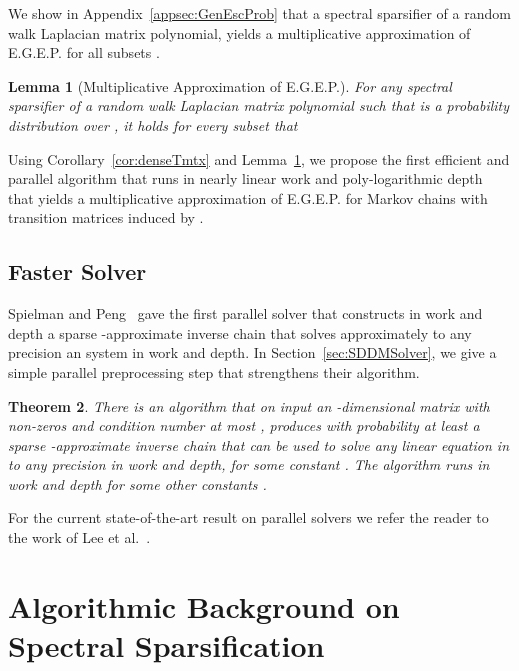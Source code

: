 \documentclass[11pt]{article}
\newtheorem{thm}{Theorem}  \newtheorem{fact}[thm]{Fact}
\newtheorem{lem}[thm]{Lemma}
\numberwithin{thm}{section}
\begin{document}
We show in Appendix~\ref{appsec:GenEscProb} that a spectral sparsifier of a random walk Laplacian matrix polynomial, yields a multiplicative approximation of E.G.E.P. for all subsets .

\begin{lem}[Multiplicative Approximation of E.G.E.P.]\label{lem_mulApproxEGEP}
For any spectral sparsifier  of a random walk Laplacian matrix polynomial such that  is a probability distribution over , it holds for every subset  that

\end{lem}

Using Corollary~\ref{cor:denseTmtx} and Lemma~\ref{lem_mulApproxEGEP}, we propose the first efficient and parallel algorithm that runs in nearly linear work and poly-logarithmic depth that yields a multiplicative approximation of E.G.E.P. for Markov chains with transition matrices induced by .



\subsection{Faster  Solver}\label{subsec:FSSMS}

Spielman and Peng~\cite{PS14} gave the first parallel  solver that constructs in  work and  depth a sparse -approximate inverse chain that solves approximately to any  precision an  system in  work and  depth. In Section~\ref{sec:SDDMSolver}, we give a simple parallel preprocessing step that strengthens their algorithm.


\begin{thm}\label{thm_SDDM_Solver}
There is an algorithm that on input an -dimensional  matrix  with  non-zeros and condition number at most , produces with probability at least  a sparse -approximate inverse chain that can be used to solve any linear equation in  to any precision  in  work and  depth, for some constant . The algorithm runs in  work and  depth for some other constants .
\end{thm}

For the current state-of-the-art result on parallel  solvers we refer the reader to the work of Lee et al.~\cite{KLPSS15}.



\section{Algorithmic Background on Spectral Sparsification}\label{sec:BN}
\end{document}
